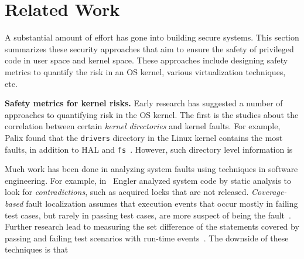 \section{Related Work}
\label{sec.related_work}

A substantial amount of effort has gone into building secure systems. 
This section summarizes these security approaches 
that aim to ensure the safety of privileged code in user space and kernel space.
These approaches include designing safety metrics to quantify the risk in an 
OS kernel, various virtualization techniques, etc.


\textbf{Safety metrics for kernel risks.}
Early research has suggested a number of approaches to quantifying risk 
in the OS kernel. The first is the studies about the correlation between certain 
\textit{kernel directories} and kernel faults. For example, 
Palix found that the \texttt{drivers} directory in the Linux kernel contains the
most faults, in addition to HAL and \texttt{fs}~\cite{palix2011faults}.
However, such directory level information is 

Much work has been done in analyzing system faults using techniques in 
software engineering. For example, 
in~\cite{engler2001bugs} Engler analyzed system code by static analysis
to look for \textit{contradictions}, such as acquired locks that are
not released.
%
%
%
\textit{Coverage-based} fault localization assumes that execution events that occur mostly in failing
test cases, but rarely in passing test cases, are more {suspect}
of being the fault~\cite{jones2002visualization}. Further research lead to measuring the set
difference of the statements covered by passing and failing test scenarios with run-time events~\cite{agrawal1995fault, jones2005empirical, liblit2005scalable}.
The downside of these techniques is that 

